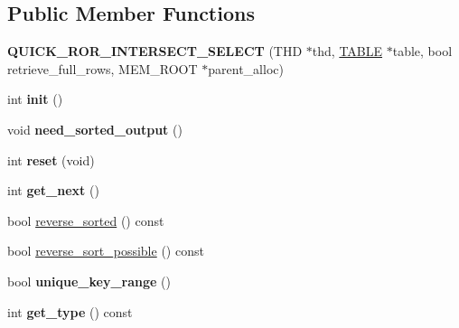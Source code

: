 \subsection*{Public Member Functions}
\begin{DoxyCompactItemize}
\item 
\mbox{\label{classQUICK__ROR__INTERSECT__SELECT_a17e2c1eb0d64755fdab71f480c6d7821}} 
{\bfseries Q\+U\+I\+C\+K\+\_\+\+R\+O\+R\+\_\+\+I\+N\+T\+E\+R\+S\+E\+C\+T\+\_\+\+S\+E\+L\+E\+CT} (T\+HD $\ast$thd, \mbox{\hyperlink{structTABLE}{T\+A\+B\+LE}} $\ast$table, bool retrieve\+\_\+full\+\_\+rows, M\+E\+M\+\_\+\+R\+O\+OT $\ast$parent\+\_\+alloc)
\item 
\mbox{\label{classQUICK__ROR__INTERSECT__SELECT_a10db5159ec29985e48ea4114d1a9d4c7}} 
int {\bfseries init} ()
\item 
\mbox{\label{classQUICK__ROR__INTERSECT__SELECT_a93334e7e52f206ebcdb39383a6dfd287}} 
void {\bfseries need\+\_\+sorted\+\_\+output} ()
\item 
\mbox{\label{classQUICK__ROR__INTERSECT__SELECT_ac321fb0544c5a10a9a8d3e1c30aad85c}} 
int {\bfseries reset} (void)
\item 
\mbox{\label{classQUICK__ROR__INTERSECT__SELECT_a17484b0902f2651c7b68edf8b273a9f0}} 
int {\bfseries get\+\_\+next} ()
\item 
bool \mbox{\hyperlink{classQUICK__ROR__INTERSECT__SELECT_a9f21e9a517a9385f4fe406a42d32b017}{reverse\+\_\+sorted}} () const
\item 
bool \mbox{\hyperlink{classQUICK__ROR__INTERSECT__SELECT_a3973616a394ee8cd2db776cd05ec2de8}{reverse\+\_\+sort\+\_\+possible}} () const
\item 
\mbox{\label{classQUICK__ROR__INTERSECT__SELECT_abba6ccbf85fe25a3b917423d79a0ccbb}} 
bool {\bfseries unique\+\_\+key\+\_\+range} ()
\item 
\mbox{\label{classQUICK__ROR__INTERSECT__SELECT_aab78b9a8892a7255944040a102eb7897}} 
int {\bfseries get\+\_\+type} () const
\item 

\end{DoxyCompactItemize}
